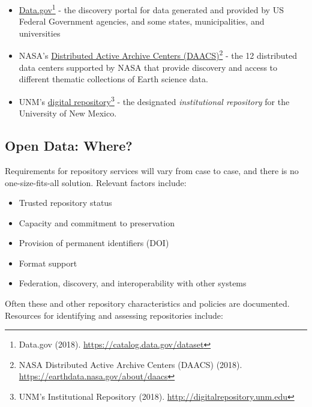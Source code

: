 \documentclass[letterpaper,twoside,11pt]{scrartcl}
\providecommand{\tightlist}{%
  \setlength{\itemsep}{0pt}\setlength{\parskip}{0pt}}
\begin{document}
\begin{multicols}{2}
\begin{itemize}
\tightlist
\item
  \href{https://catalog.data.gov/dataset}{Data.gov}\footnote{Data.gov
    (2018). \url{https://catalog.data.gov/dataset}} - the discovery
  portal for data generated and provided by US Federal Government
  agencies, and some states, municipalities, and universities
\item
  NASA's \href{https://earthdata.nasa.gov/about/daacs}{Distributed
  Active Archive Centers (DAACS)}\footnote{NASA Distributed Active
    Archive Centers (DAACS) (2018).
    \url{https://earthdata.nasa.gov/about/daacs}} - the 12 distributed
  data centers supported by NASA that provide discovery and access to
  different thematic collections of Earth science data.
\item
  UNM's \href{http://digitalrepository.unm.edu}{digital
  repository}\footnote{UNM's Institutional Repository (2018).
    \url{http://digitalrepository.unm.edu}} - the designated
  \emph{institutional repository} for the University of New Mexico.
\end{itemize}

\subsection{Open Data: Where?}\label{open-data-where}

Requirements for repository services will vary from case to case, and
there is no one-size-fits-all solution. Relevant factors include:

\begin{itemize}
\tightlist
\item
  Trusted repository status
\item
  Capacity and commitment to preservation
\item
  Provision of permanent identifiers (DOI)
\item
  Format support
\item
  Federation, discovery, and interoperability with other systems
\end{itemize}

Often these and other repository characteristics and policies are
documented. Resources for identifying and assessing repositories
include:


\end{multicols}
\end{document}

